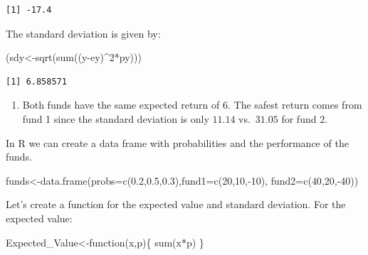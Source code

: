 \documentclass[
  letterpaper,
  DIV=11,
  numbers=noendperiod]{scrreprt}
\newenvironment{Shaded}{\begin{snugshade}}{\end{snugshade}}
\newcommand{\AttributeTok}[1]{\textcolor[rgb]{0.40,0.45,0.13}{#1}}
\newcommand{\ControlFlowTok}[1]{\textcolor[rgb]{0.00,0.23,0.31}{#1}}
\newcommand{\DecValTok}[1]{\textcolor[rgb]{0.68,0.00,0.00}{#1}}
\newcommand{\FloatTok}[1]{\textcolor[rgb]{0.68,0.00,0.00}{#1}}
\newcommand{\FunctionTok}[1]{\textcolor[rgb]{0.28,0.35,0.67}{#1}}
\newcommand{\NormalTok}[1]{\textcolor[rgb]{0.00,0.23,0.31}{#1}}
\newcommand{\OtherTok}[1]{\textcolor[rgb]{0.00,0.23,0.31}{#1}}
\newcommand{\SpecialCharTok}[1]{\textcolor[rgb]{0.37,0.37,0.37}{#1}}
\providecommand{\tightlist}{%
  \setlength{\itemsep}{0pt}\setlength{\parskip}{0pt}}\usepackage{longtable,booktabs,array}
\begin{document}
\begin{verbatim}
[1] -17.4
\end{verbatim}

The standard deviation is given by:

\begin{Shaded}
\begin{Highlighting}[numbers=left,,]
\NormalTok{(sdy}\OtherTok{\textless{}{-}}\FunctionTok{sqrt}\NormalTok{(}\FunctionTok{sum}\NormalTok{((y}\SpecialCharTok{{-}}\NormalTok{ey)}\SpecialCharTok{\^{}}\DecValTok{2}\SpecialCharTok{*}\NormalTok{py)))}
\end{Highlighting}
\end{Shaded}

\begin{verbatim}
[1] 6.858571
\end{verbatim}

\begin{blackbox}

\begin{enumerate}
\def\labelenumi{\arabic{enumi}.}
\setcounter{enumi}{2}
\tightlist
\item
  Both funds have the same expected return of \(6\). The safest return
  comes from fund 1 since the standard deviation is only \(11.14\)
  vs.~\(31.05\) for fund 2.
\end{enumerate}

\end{blackbox}

In R we can create a data frame with probabilities and the performance
of the funds.

\begin{Shaded}
\begin{Highlighting}[numbers=left,,]
\NormalTok{funds}\OtherTok{\textless{}{-}}\FunctionTok{data.frame}\NormalTok{(}\AttributeTok{probs=}\FunctionTok{c}\NormalTok{(}\FloatTok{0.2}\NormalTok{,}\FloatTok{0.5}\NormalTok{,}\FloatTok{0.3}\NormalTok{),}\AttributeTok{fund1=}\FunctionTok{c}\NormalTok{(}\DecValTok{20}\NormalTok{,}\DecValTok{10}\NormalTok{,}\SpecialCharTok{{-}}\DecValTok{10}\NormalTok{), }\AttributeTok{fund2=}\FunctionTok{c}\NormalTok{(}\DecValTok{40}\NormalTok{,}\DecValTok{20}\NormalTok{,}\SpecialCharTok{{-}}\DecValTok{40}\NormalTok{))}
\end{Highlighting}
\end{Shaded}

Let's create a function for the expected value and standard deviation.
For the expected value:

\begin{Shaded}
\begin{Highlighting}[numbers=left,,]
\NormalTok{Expected\_Value}\OtherTok{\textless{}{-}}\ControlFlowTok{function}\NormalTok{(x,p)\{}
  \FunctionTok{sum}\NormalTok{(x}\SpecialCharTok{*}\NormalTok{p)}
\NormalTok{\}}
\end{Highlighting}
\end{Shaded}
\end{document}
